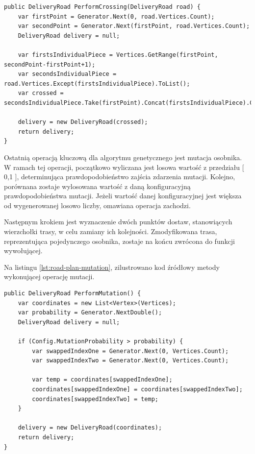 \begin{lstlisting}[label=lst:road-plan-generate-others,caption=Kod metody generującej zbiór pozostałych osobników dla nowej populacji, captionpos=b,basicstyle=\footnotesize\ttfamily,style=sharpcstyle,language={[Sharp]C}]
public DeliveryRoad PerformCrossing(DeliveryRoad road) {
	var firstPoint = Generator.Next(0, road.Vertices.Count);
	var secondPoint = Generator.Next(firstPoint, road.Vertices.Count);
	DeliveryRoad delivery = null;
	
	var firstsIndividualPiece = Vertices.GetRange(firstPoint, secondPoint-firstPoint+1);
	var secondsIndividualPiece = road.Vertices.Except(firstsIndividualPiece).ToList();
	var crossed = secondsIndividualPiece.Take(firstPoint).Concat(firstsIndividualPiece).Concat(secondsIndividualPiece.Skip(firstPoint)).ToList();
	
	delivery = new DeliveryRoad(crossed);
	return delivery;
}
\end{lstlisting}

Ostatnią operacją kluczową dla algorytmu genetycznego jest mutacja osobnika. W ramach tej operacji, początkowo wyliczana jest losowa wartość z przedziału [ 0,1 ], determinująca prawdopodobieństwo zajścia zdarzenia mutacji. Kolejno, porównana zostaje wylosowana wartość z daną konfiguracyjną prawdopodobieństwa mutacji. Jeżeli wartość danej konfiguracyjnej jest większa od wygenerowanej losowo liczby, omawiana operacja zachodzi.

Następnym krokiem jest wyznaczenie dwóch punktów dostaw, stanowiących wierzchołki trasy, w celu zamiany ich kolejności. Zmodyfikowana trasa, reprezentująca pojedynczego osobnika, zostaje na końcu zwrócona do funkcji wywołującej.

Na listingu \ref{lst:road-plan-mutation}, zilustrowano kod źródłowy metody wykonującej operację mutacji.

\begin{lstlisting}[label=lst:road-plan-mutation,caption=Kod funkcji składowej wykonującej operację mutacji osobnika, captionpos=b,basicstyle=\footnotesize\ttfamily,style=sharpcstyle,language={[Sharp]C}]
public DeliveryRoad PerformMutation() {
	var coordinates = new List<Vertex>(Vertices);
	var probability = Generator.NextDouble();
	DeliveryRoad delivery = null;

	if (Config.MutationProbability > probability) {
		var swappedIndexOne = Generator.Next(0, Vertices.Count);
		var swappedIndexTwo = Generator.Next(0, Vertices.Count);

		var temp = coordinates[swappedIndexOne];
		coordinates[swappedIndexOne] = coordinates[swappedIndexTwo];
		coordinates[swappedIndexTwo] = temp;
	}

	delivery = new DeliveryRoad(coordinates);
	return delivery;
}
\end{lstlisting}

